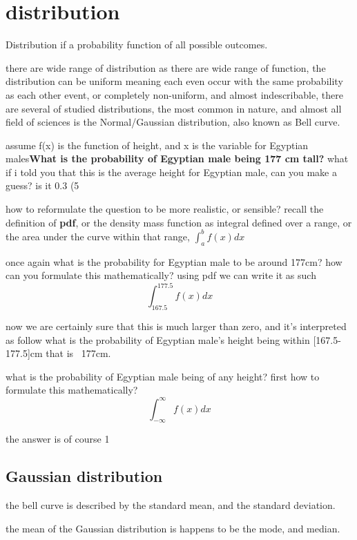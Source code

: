 \documentclass[4apaper,12pt]{book}
\begin{document}
  \section{distribution}
  \begin{description}
  \item Distribution if a probability function of all possible outcomes.
  \item there are wide range of distribution as there are wide range of function, the distribution can be uniform meaning each even occur with the same probability as each other event, or completely non-uniform, and almost indescribable, there are several of studied distributions, the most common in nature, and almost all field of sciences is the Normal/Gaussian distribution, also known as Bell curve.
  \item assume f(x) is the function of height, and x is the variable for Egyptian males\textbf{What is the probability of Egyptian male being 177 cm tall?} what if i told you that this is the average height for Egyptian male, can you make a guess? is it 0.3 (5%
    \item how to reformulate the question to be more realistic, or sensible? recall the definition of \textbf{pdf}, or the density mass function as integral defined over a range, or the area under the curve within that range, $\int_{a}^{b}f(x)dx$
    \item once again what is the probability for Egyptian male to be around 177cm? how can you formulate this mathematically? using pdf we can write it as such
      \begin{equation} \int_{167.5}^{177.5}f(x)dx \end{equation}
    \item now we are certainly sure that this is much larger than zero, and it's interpreted as follow what is the probability of Egyptian male's height  being within [167.5-177.5]cm that is ~177cm.
    \item what is the probability of Egyptian male being of any height? first how to formulate this mathematically?
      \begin{equation} \int_{-\infty}^{\infty}f(x)dx \end{equation}
    \item the answer is of course 1
    \subsection{Gaussian distribution}
    \begin{description}
  \item the bell curve is described by the standard mean, and the standard deviation.
  \item the mean of the Gaussian distribution is happens to be the mode, and median.

\end{description}
\end{description}
\end{document}
